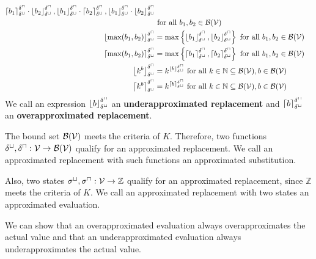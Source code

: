 \begin{definition}
\begin{align*}
{      \left\lceil b_1 \right\rceil^{\delta^\sqcap}_{\delta^\sqcup} \cdot \left\lfloor b_2 \right\rfloor^{\delta^\sqcap}_{\delta^\sqcup},
      \left\lfloor b_1 \right\rfloor^{\delta^\sqcap}_{\delta^\sqcup} \cdot \left\lceil b_2 \right\rceil^{\delta^\sqcap}_{\delta^\sqcup},
      \left\lfloor b_1 \right\rfloor^{\delta^\sqcap}_{\delta^\sqcup} \cdot \left\lfloor b_2 \right\rfloor^{\delta^\sqcap}_{\delta^\sqcup}
    } \\ & \text{ for all } b_1, b_2 \in \mathcal{B}(\mathcal{V}) \\
    \left\lfloor \max(b_1, b_2) \right\rfloor^{\delta^\sqcap}_{\delta^\sqcup} &= \max \left\lbrace \left\lfloor b_1 \right\rfloor^{\delta^\sqcap}_{\delta^\sqcup}, \left\lfloor b_2 \right\rfloor^{\delta^\sqcap}_{\delta^\sqcup} \right\rbrace \text{ for all } b_1, b_2 \in \mathcal{B}(\mathcal{V}) \\
    \left\lceil \max(b_1, b_2) \right\rceil^{\delta^\sqcap}_{\delta^\sqcup} &= \max \left\lbrace \left\lceil b_1 \right\rceil^{\delta^\sqcap}_{\delta^\sqcup}, \left\lceil b_2 \right\rceil^{\delta^\sqcap}_{\delta^\sqcup} \right\rbrace \text{ for all } b_1, b_2 \in \mathcal{B}(\mathcal{V}) \\
    \left\lfloor k^b \right\rfloor^{\delta^\sqcap}_{\delta^\sqcup} &= k^{\left\lfloor b \right\rfloor^{\delta^\sqcap}_{\delta^\sqcup}} \text{ for all } k \in \mathbb{N} \subseteq \mathcal{B}(\mathcal{V}), b \in \mathcal{B}(\mathcal{V}) \\
    \left\lceil k^b \right\rceil^{\delta^\sqcap}_{\delta^\sqcup} &= k^{\left\lceil b \right\rceil^{\delta^\sqcap}_{\delta^\sqcup}} \text{ for all } k \in \mathbb{N} \subseteq \mathcal{B}(\mathcal{V}), b \in \mathcal{B}(\mathcal{V})
  \end{align*}
  We call an expression $\left\lfloor b \right\rfloor^{\delta^\sqcap}_{\delta^\sqcup}$ an \textbf{underapproximated replacement} and $\left\lceil b \right\rceil^{\delta^\sqcap}_{\delta^\sqcup}$ an \textbf{overapproximated replacement}.
\end{definition}

The bound set $\mathcal{B}(\mathcal{V})$ meets the criteria of $K$.
Therefore, two functions $\delta^\sqcup, \delta^\sqcap: \mathcal{V} \rightarrow \mathcal{B}(\mathcal{V})$ qualify for an approximated replacement.
We call an approximated replacement with such functions an approximated substitution.

Also, two states ${\sigma^\sqcup}, {\sigma^\sqcap}: \mathcal{V} \rightarrow \mathbb{Z}$ qualify for an approximated replacement, since $\mathbb{Z}$ meets the criteria of $K$.
We call an approximated replacement with two states an approximated evaluation.

We can show that an overapproximated evaluation always overapproximates the actual value and that an underapproximated evaluation always underapproximates the actual value.



